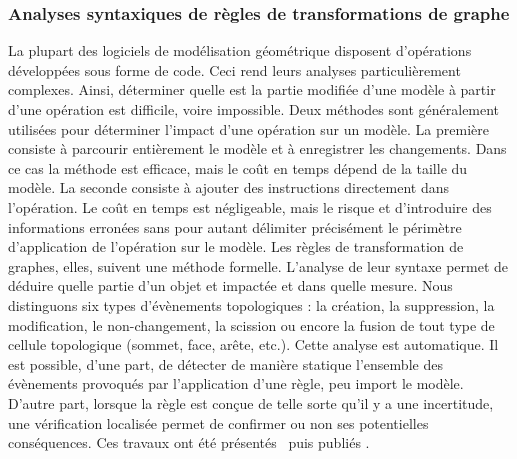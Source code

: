 \documentclass[11pt,a4paper,oneside]{article}
\begin{document}
\subsubsection{Analyses syntaxiques de règles de transformations de graphe}
La plupart des logiciels de modélisation géométrique disposent d'opérations
développées sous forme de code. %
Ceci rend leurs analyses particulièrement complexes. %
Ainsi, déterminer quelle est la partie modifiée d'une modèle à partir d'une
opération est difficile, voire impossible. %
Deux méthodes sont généralement utilisées pour déterminer l'impact d'une
opération sur un modèle. %
La première consiste à parcourir entièrement le modèle et à enregistrer les
changements. %
Dans ce cas la méthode est efficace, mais le coût en temps dépend de la taille
du modèle. %
La seconde consiste à ajouter des instructions directement dans l'opération. %
Le coût en temps est négligeable, mais le risque et d'introduire des
informations erronées sans pour autant délimiter précisément le périmètre
d'application de l'opération sur le modèle. %
Les règles de transformation de graphes, elles, suivent une méthode formelle. %
L'analyse de leur syntaxe permet de déduire quelle partie d'un objet et impactée
et dans quelle mesure. %
Nous distinguons six types d'évènements topologiques : la création, la
suppression, la modification, le non-changement, la scission ou encore la fusion
de tout type de cellule topologique (sommet, face, arête, etc.). %
Cette analyse est automatique. %
Il est possible, d'une part, de détecter de manière statique l'ensemble des
évènements provoqués par l'application d'une règle, peu import le modèle. %
D'autre part, lorsque la règle est conçue de telle sorte qu'il y a une
incertitude, une vérification localisée permet de confirmer ou non ses
potentielles conséquences. %
Ces travaux ont été présentés~\cite{gaide2023detection} puis publiés
\cite{gaide2023automatic}. %
\end{document}
